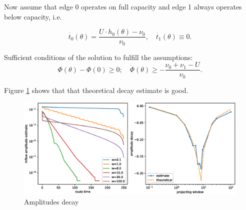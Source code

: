 \documentclass[12pt]{article}
\begin{document}
Now assume that edge 0 operates on full capacity and  edge 1 always operates below capacity, i.e.

$$\dot{t_0}(\theta) = \frac{U\cdot h_0(\theta) - \nu_0}{\nu_0}, \quad
 \dot{t_1}(\theta) \equiv 0 .$$

Sufficient conditions of the solution to fulfill the assumptions:
 $$\Phi(\theta) - \Phi(0) \geq 0; \quad \dot{\Phi}(\theta) \geq  - \frac{ \nu_0 + \nu_1 - U}{\nu_0} .$$

%

Figure \ref{fig:amplitudes_decay} shows that that theoretical decay estimate is good.

\begin{figure}
	\includegraphics[scale=0.5]{img/amplitudes_decay.eps}
	\caption{Amplitudes decay }
	\label{fig:amplitudes_decay}

\end{figure}	
\end{document}

